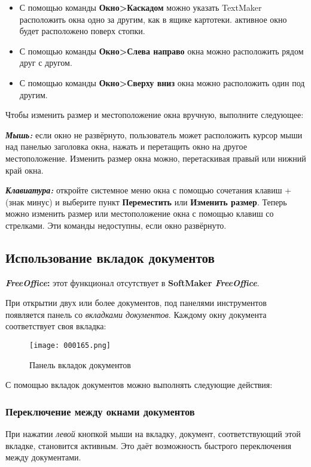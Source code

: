 ﻿\documentclass[a4paper,10pt]{article}
\begin{document}
\begin{itemize}
 \item С помощью команды \textbf{Окно>Каскадом} можно указать TextMaker расположить окна одно за другим, как в ящике картотеки. активное окно будет расположено поверх стопки.
 \item С помощью команды \textbf{Окно>Слева направо} окна можно расположить рядом друг с другом.
 \item  С помощью команды \textbf{Окно>Сверху вниз} окна можно расположить один под другим.
\end{itemize}

Чтобы изменить размер и местоположение окна вручную, выполните следующее:

\textbf{\textit{Мышь:}} если окно не развёрнуто, пользователь может расположить курсор мыши над панелью заголовка окна, нажать и перетащить окно на другое местоположение. Изменить размер окна можно, перетаскивая правый или нижний край окна.

\textbf{\textit{Клавиатура:}} откройте системное меню окна с помощью сочетания клавиш +\keys{-} (знак минус) и выберите пункт \textbf{Переместить} или \textbf{Изменить размер}. Теперь можно изменить размер или местоположение окна с помощью клавиш со стрелками. Эти команды недоступны, если окно развёрнуто.

\subsection{Использование вкладок документов}
\begin{mdframed}[backgroundcolor=pink!50]
\textbf{\textit{FreeOffice}:} этот функционал отсутствует в \textbf{SoftMaker \textit{FreeOffice}}.
\end{mdframed}

При открытии двух или более документов, под панелями инструментов появляется панель со \textit{вкладками документов}. Каждому окну документа соответствует своя вкладка:

\begin{figure}[ht]
\texttt{[image: 000165.png]}
\centering
\caption{Панель вкладок документов}
\end{figure} 
 
С помощью вкладок документов можно выполнять следующие действия: 

\subsubsection{Переключение между окнами документов}
При нажатии \textit{левой} кнопкой мыши на вкладку, документ, соответствующий этой вкладке, становится активным. Это даёт возможность быстрого переключения между документами.
\end{document}
